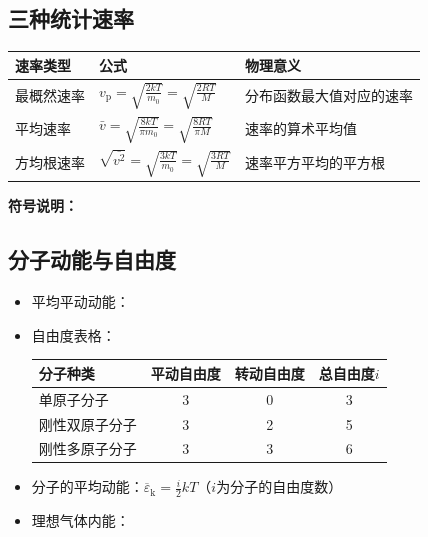 \subsection{三种统计速率}
\begin{center}
\scriptsize
\begin{tabular}{@{}p{1.8cm}|p{5cm}|p{4.8cm}@{}}
    \toprule
    \rowcolor{tablehead} 速率类型 & 公式 & 物理意义 \\
    \midrule
    最概然速率 & $v_{\text{p}} = \sqrt{\frac{2kT}{m_0}} = \sqrt{\frac{2RT}{M}}$ & 分布函数最大值对应的速率 \\
    \midrule
    平均速率 & $\bar{v} = \sqrt{\frac{8kT}{\pi m_0}} = \sqrt{\frac{8RT}{\pi M}}$ & 速率的算术平均值 \\
    \midrule
    方均根速率 & $\sqrt{\overline{v^2}} = \sqrt{\frac{3kT}{m_0}} = \sqrt{\frac{3RT}{M}}$ & 速率平方平均的平方根 \\
    \bottomrule
\end{tabular}
\end{center}

\textbf{符号说明：}\\

\subsection{分子动能与自由度}
\begin{itemize}
    \item 平均平动动能：
    \item 自由度表格：
        \begin{center}
            \scriptsize
            \begin{tabular}{@{}p{2.2cm}|c|c|c@{}}
                \toprule
                \rowcolor{tablehead} 分子种类 & 平动自由度 & 转动自由度 & 总自由度$i$ \\
                \midrule
                单原子分子 & 3 & 0 & 3 \\
                \midrule
                刚性双原子分子 & 3 & 2 & 5 \\
                \midrule
                刚性多原子分子 & 3 & 3 & 6 \\
                \bottomrule
            \end{tabular}
        \end{center}
    \item 分子的平均动能：$\overline{\varepsilon}_{\text{k}} = \frac{i}{2} kT$（$i$为分子的自由度数）
    \item 理想气体内能：
\end{itemize}

